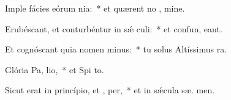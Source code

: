 \item Imple fácies eórum nia:~* et quærent no , mine.
\item Erubéscant, et conturbéntur in sǽ culi:~* et confun,  eant.
\item Et cognóscant quia nomen  minus:~* tu solus Altíssimus   ra.
\item Glória Pa,  lio,~* et Spi to.
\item Sicut erat in princípio, et ,  per,~* et in sǽcula sæ. men.
